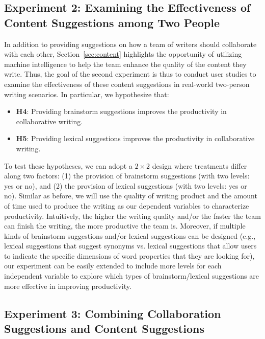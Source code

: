 \subsection{Experiment 2: Examining the Effectiveness of Content Suggestions among Two People}
\label{sec:exp2}
In addition to providing suggestions on how a team of writers should collaborate with each other, Section~\ref{sec:content} highlights the opportunity of utilizing machine intelligence to help the team enhance the quality of the content they write. Thus, the goal of the second experiment is thus to conduct user studies to examine the effectiveness of these content suggestions in real-world two-person writing scenarios. In particular, we hypothesize that:
\begin{itemize}
\item{\bf H4}: Providing brainstorm suggestions improves the productivity in collaborative writing.
\item{\bf H5}: Providing lexical suggestions improves the productivity in collaborative writing.
\end{itemize}

To test these hypotheses, we can adopt a $2\times 2$ design where treatments differ along two factors: (1) the provision of brainstorm suggestions (with two levels: yes or no), and (2) the provision of lexical suggestions (with two levels: yes or no). Similar as before, we will use the quality of writing product and the amount of time used to produce the writing as our dependent variables to characterize productivity. Intuitively, the higher the writing quality and/or the faster the team can finish the writing, the more productive the team is. Moreover, if multiple kinds of brainstorm suggestions and/or lexical suggestions can be designed (e.g., lexical suggestions that suggest synonyms vs. lexical suggestions that allow users to indicate the specific dimensions of word properties that they are looking for), our experiment can be easily extended to include more levels for each independent variable to explore which types of brainstorm/lexical suggestions are more effective in improving productivity.

\subsection{Experiment 3: Combining Collaboration Suggestions and Content Suggestions}
\label{sec:exp3}

